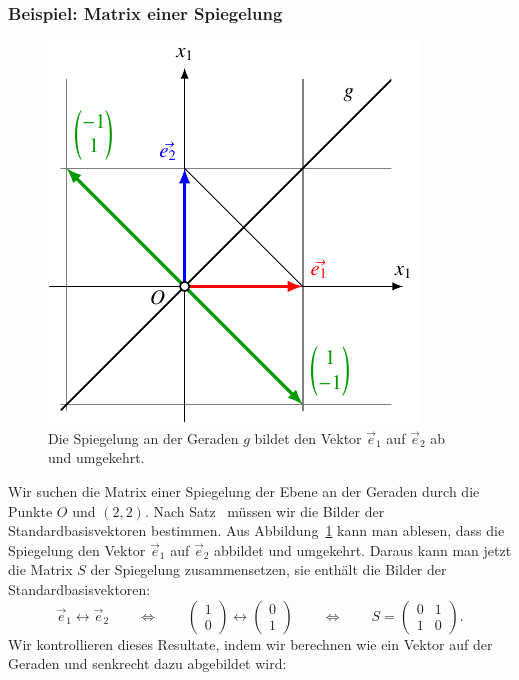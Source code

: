 \subsubsection{Beispiel: Matrix einer Spiegelung}
\begin{figure}
\centering
\includegraphics{3/images/spiegelung.pdf}
\caption{Die Spiegelung an der Geraden $g$ bildet den Vektor
$\vec{e}_1$ auf $\vec{e}_2$ ab und umgekehrt.
\label{skript:affin:spiegelung}}
\end{figure}
Wir suchen die Matrix einer Spiegelung der Ebene an der Geraden durch
die Punkte $O$ und $(2,2)$.
Nach Satz~\label{satz:affin:bilderderstandardbasisvektoren} müssen wir 
die Bilder der Standardbasisvektoren bestimmen.
Aus Abbildung~\ref{skript:affin:spiegelung} kann man ablesen, dass die
Spiegelung den Vektor $\vec{e}_1$ auf $\vec{e}_2$ abbildet und umgekehrt.
Daraus kann man jetzt die Matrix $S$ der Spiegelung zusammensetzen,
sie enthält die Bilder der Standardbasisvektoren:
\[
\vec{e}_1\leftrightarrow\vec{e}_2
\qquad\Leftrightarrow\qquad
\begin{pmatrix}1\\0\end{pmatrix}
\leftrightarrow
\begin{pmatrix}0\\1\end{pmatrix}
\qquad\Leftrightarrow\qquad
S
=
\begin{pmatrix}0&1\\1&0\end{pmatrix}.
\]
Wir kontrollieren dieses Resultate, indem wir berechnen wie ein Vektor
auf der Geraden und senkrecht dazu abgebildet wird:
